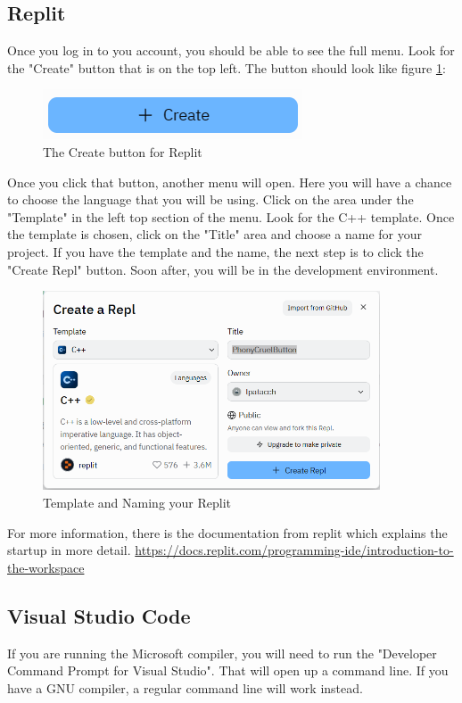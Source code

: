 \subsection{Replit}
Once you log in to you account, you should be able to see the full
menu. Look for the "Create" button that is on the top left. The button
should look like figure \ref{fig:createreplit}:
\begin{figure}[h]
    \centering
    \includegraphics{images/CreateButtonReplit.PNG}
    \caption{The Create button for Replit}
    \label{fig:createreplit}
\end{figure}
Once you click that button, another menu will open. Here you will have a chance to choose the language
that you will be using. Click on the area under the "Template" in the left top section of the menu. Look for the C++ template. Once the template is chosen, click on the "Title" area and choose a name 
for your project. If you have the template and the name, the next step 
is to click the "Create Repl" button. Soon after, you will be in the
development environment.
\begin{figure}[h]
    \centering
    \includegraphics[width = 10cm]{images/createreplitmenu.PNG}
    \caption{Template and Naming your Replit}
    \label{fig:replitmenu}
\end{figure}


For more information, there is the documentation from replit which explains the startup in more detail. 
\url{https://docs.replit.com/programming-ide/introduction-to-the-workspace}
\subsection{Visual Studio Code}
If you are running the Microsoft compiler, you will need to run the "Developer Command Prompt for Visual Studio". That will open up a command line. If you have a GNU compiler, a regular command line will work instead. 

